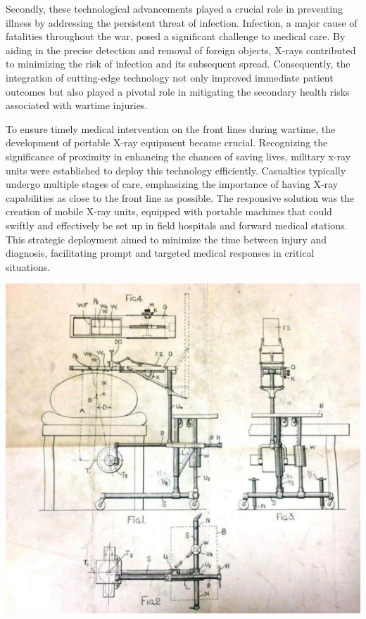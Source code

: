 \documentclass[a4paper,12pt]{report}
\begin{document}
Secondly, these technological advancements played a crucial role in preventing illness by
addressing the persistent threat of infection. Infection, a major cause of fatalities throughout the
war, posed a significant challenge to medical care. By aiding in the precise detection and removal
of foreign objects, X-rays contributed to minimizing the risk of infection and its subsequent
spread. Consequently, the integration of cutting-edge technology not only improved immediate
patient outcomes but also played a pivotal role in mitigating the secondary health risks associated
with wartime injuries.

To ensure timely medical intervention on the front lines during wartime, the development of
portable X-ray equipment became crucial. Recognizing the significance of proximity in
enhancing the chances of saving lives, military x-ray units were established to deploy this
technology efficiently. Casualties typically undergo multiple stages of care, emphasizing the
importance of having X-ray capabilities as close to the front line as possible. The responsive
solution was the creation of mobile X-ray units, equipped with portable machines that could
swiftly and effectively be set up in field hospitals and forward medical stations. This strategic
deployment aimed to minimize the time between injury and diagnosis, facilitating prompt and
targeted medical responses in critical situations.

\begin{center}
  \includegraphics[scale = 1]{drawing.png}
  \label{drawing}
\end{center}
\end{document}
